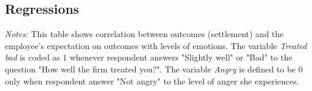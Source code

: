 \documentclass[11pt, a4paper]{article}
\begin{document}
\newpage

\begin{landscape}
\section{Regressions}
\begin{table}[!ht]
    \caption{Correlation between emotions and bargaining}
    \label{tab:TreatmentArms}
    \begin{center}
     \scriptsize{}
     \end{center}
    
     \scriptsize
\textit{Notes:} This table shows correlation between outcomes (settlement) and the employee's expectation on outcomes with levels of emotions. The variable \textit{Treated bad} is coded as $1$ whenever respondent answers "Slightly well" or "Bad" to the question "How well the firm treated you?". The variable \textit{Angry} is defined to be $0$ only when respondent answer "Not angry" to the level of anger she experiences.  
\end{table}
\end{landscape} 
\end{document}
